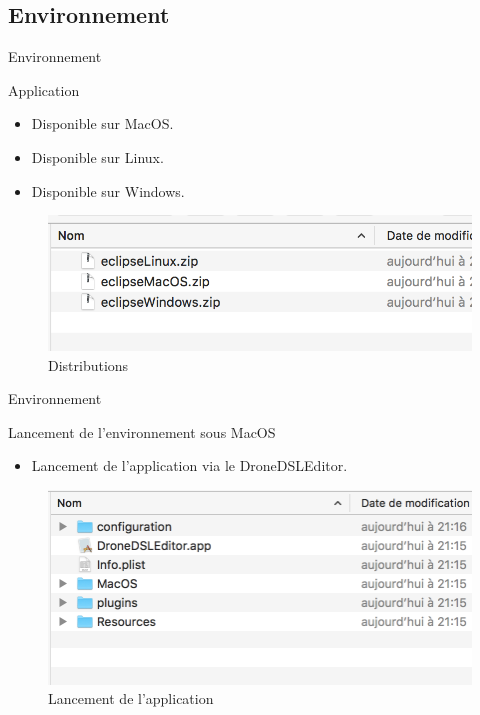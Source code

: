 \documentclass{bredelebeamer}
\begin{document}
	\subsection{Environnement}
\begin{frame}{Environnement}
\begin{block}{Application}
\begin{itemize}
\item Disponible sur MacOS.
\item Disponible sur Linux.
\item Disponible sur Windows.
\end{itemize}
\end{block}\pause
\begin{figure}
\centering
\includegraphics[scale=0.5]{images/01.png}
\caption{Distributions}
\end{figure}
\end{frame}
    
\begin{frame}{Environnement}
\begin{block}{Lancement de l'environnement sous MacOS}
\begin{itemize}
\item Lancement de l'application via le DroneDSLEditor.
\end{itemize}
\end{block}\pause
\begin{figure}
\centering
\includegraphics[scale=0.5]{images/02.png}
\caption{Lancement de l'application}
\end{figure}
\end{frame}
\end{document}
